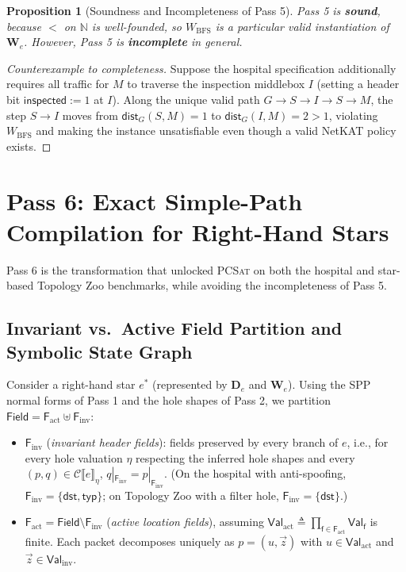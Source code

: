 \documentclass[11pt,a4paper]{article}
\newtheorem{proposition}[theorem]{Proposition}
\theoremstyle{definition}
\theoremstyle{remark}
\newcommand{\Field}{\mathsf{Field}}
\newcommand{\Val}{\mathsf{Val}}
\newcommand{\Csem}[1]{\mathcal{C}\llbracket #1 \rrbracket}
\begin{document}
\begin{proposition}[Soundness and Incompleteness of Pass 5]
Pass 5 is \textbf{sound}, because $<$ on $\mathbb{N}$ is well-founded, so $W_{\mathrm{BFS}}$ is a
particular valid instantiation of $\mathbf{W}_e$. However, Pass 5 is \textbf{incomplete} in general.
\end{proposition}

\begin{proof}[Counterexample to completeness]
Suppose the hospital specification additionally requires all traffic for $M$ to traverse the
inspection middlebox $I$ (setting a header bit $\mathsf{inspected} := 1$ at $I$). Along the unique
valid path $G \to S \to I \to S \to M$, the step $S \to I$ moves from $\mathsf{dist}_G(S, M) = 1$ to
$\mathsf{dist}_G(I, M) = 2 > 1$, violating $W_{\mathrm{BFS}}$ and making the instance unsatisfiable
even though a valid NetKAT policy exists.
\end{proof}

\section{Pass 6: Exact Simple-Path Compilation for Right-Hand Stars}

Pass 6 is the transformation that unlocked \textsc{PCSat} on both the hospital and star-based
Topology Zoo benchmarks, while avoiding the incompleteness of Pass 5.

\subsection{Invariant vs.\ Active Field Partition and Symbolic State Graph}

Consider a right-hand star $e^*$ (represented by $\mathbf{D}_e$ and $\mathbf{W}_e$). Using the SPP
normal forms of Pass 1 and the hole shapes of Pass 2, we partition $\Field = \mathsf{F}_{\mathrm{act}} \uplus \mathsf{F}_{\mathrm{inv}}$:
\begin{itemize}
  \item $\mathsf{F}_{\mathrm{inv}}$ (\emph{invariant header fields}): fields preserved by every
        branch of $e$, i.e., for every hole valuation $\eta$ respecting the inferred hole shapes and
        every $(p, q) \in \Csem{e}_\eta$, $q|_{\mathsf{F}_{\mathrm{inv}}} = p|_{\mathsf{F}_{\mathrm{inv}}}$.
        (On the hospital with anti-spoofing, $\mathsf{F}_{\mathrm{inv}} = \{\mathsf{dst}, \mathsf{typ}\}$;
        on Topology Zoo with a filter hole, $\mathsf{F}_{\mathrm{inv}} = \{\mathsf{dst}\}$.)
  \item $\mathsf{F}_{\mathrm{act}} = \Field \setminus \mathsf{F}_{\mathrm{inv}}$ (\emph{active
        location fields}), assuming $\Val_{\mathrm{act}} \triangleq \prod_{\mathsf{f} \in \mathsf{F}_{\mathrm{act}}} \Val_{\mathsf{f}}$
        is finite. Each packet decomposes uniquely as $p = (u, \vec{z})$ with $u \in \Val_{\mathrm{act}}$
        and $\vec{z} \in \Val_{\mathrm{inv}}$.
\end{itemize}
\end{document}
